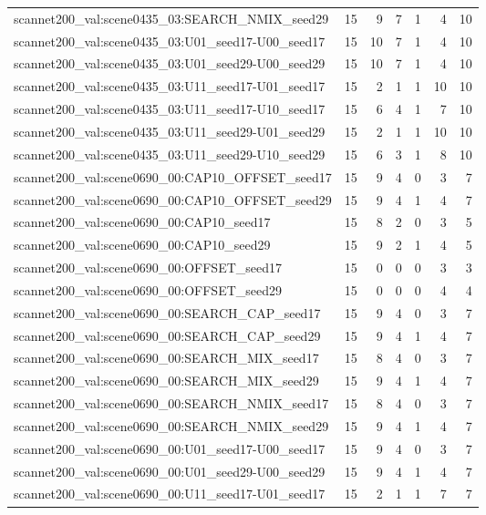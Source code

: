 \begin{table}[t]
\begin{tabular}{lrrrrrr}
scannet200\_val:scene0435\_03:SEARCH\_NMIX\_seed29 & 15 & 9 & 7 & 1 & 4 & 10 \\
scannet200\_val:scene0435\_03:U01\_seed17-U00\_seed17 & 15 & 10 & 7 & 1 & 4 & 10 \\
scannet200\_val:scene0435\_03:U01\_seed29-U00\_seed29 & 15 & 10 & 7 & 1 & 4 & 10 \\
scannet200\_val:scene0435\_03:U11\_seed17-U01\_seed17 & 15 & 2 & 1 & 1 & 10 & 10 \\
scannet200\_val:scene0435\_03:U11\_seed17-U10\_seed17 & 15 & 6 & 4 & 1 & 7 & 10 \\
scannet200\_val:scene0435\_03:U11\_seed29-U01\_seed29 & 15 & 2 & 1 & 1 & 10 & 10 \\
scannet200\_val:scene0435\_03:U11\_seed29-U10\_seed29 & 15 & 6 & 3 & 1 & 8 & 10 \\
scannet200\_val:scene0690\_00:CAP10\_OFFSET\_seed17 & 15 & 9 & 4 & 0 & 3 & 7 \\
scannet200\_val:scene0690\_00:CAP10\_OFFSET\_seed29 & 15 & 9 & 4 & 1 & 4 & 7 \\
scannet200\_val:scene0690\_00:CAP10\_seed17 & 15 & 8 & 2 & 0 & 3 & 5 \\
scannet200\_val:scene0690\_00:CAP10\_seed29 & 15 & 9 & 2 & 1 & 4 & 5 \\
scannet200\_val:scene0690\_00:OFFSET\_seed17 & 15 & 0 & 0 & 0 & 3 & 3 \\
scannet200\_val:scene0690\_00:OFFSET\_seed29 & 15 & 0 & 0 & 0 & 4 & 4 \\
scannet200\_val:scene0690\_00:SEARCH\_CAP\_seed17 & 15 & 9 & 4 & 0 & 3 & 7 \\
scannet200\_val:scene0690\_00:SEARCH\_CAP\_seed29 & 15 & 9 & 4 & 1 & 4 & 7 \\
scannet200\_val:scene0690\_00:SEARCH\_MIX\_seed17 & 15 & 8 & 4 & 0 & 3 & 7 \\
scannet200\_val:scene0690\_00:SEARCH\_MIX\_seed29 & 15 & 9 & 4 & 1 & 4 & 7 \\
scannet200\_val:scene0690\_00:SEARCH\_NMIX\_seed17 & 15 & 8 & 4 & 0 & 3 & 7 \\
scannet200\_val:scene0690\_00:SEARCH\_NMIX\_seed29 & 15 & 9 & 4 & 1 & 4 & 7 \\
scannet200\_val:scene0690\_00:U01\_seed17-U00\_seed17 & 15 & 9 & 4 & 0 & 3 & 7 \\
scannet200\_val:scene0690\_00:U01\_seed29-U00\_seed29 & 15 & 9 & 4 & 1 & 4 & 7 \\
scannet200\_val:scene0690\_00:U11\_seed17-U01\_seed17 & 15 & 2 & 1 & 1 & 7 & 7 \\

\end{tabular}
\end{table}
